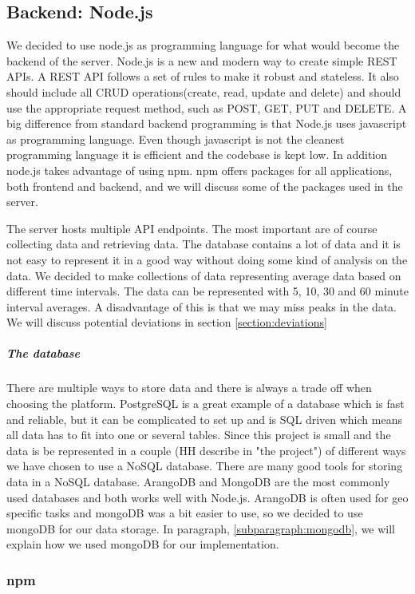 \documentclass[USenglish]{ifimaster}  %
\begin{document}
\subsection{Backend: Node.js}
We decided to use node.js as programming language for what would become the backend of the server. Node.js is a new and modern way to create simple REST APIs. A REST API follows a set of rules to make it robust and stateless. It also should include all CRUD operations(create, read, update and delete) and should use the appropriate request method, such as POST, GET, PUT and DELETE. A big difference from standard backend programming is that Node.js uses javascript as programming language. Even though javascript is not the cleanest programming language it is efficient and the codebase is kept low. In addition node.js takes advantage of using \acrfull{npm}. \acrshort{npm} offers packages for all applications, both frontend and backend, and we will discuss some of the packages used in the server.


The server hosts multiple API endpoints. The most important are of course collecting data and retrieving data. The database contains a lot of data and it is not easy to represent it in a good way without doing some kind of analysis on the data. We decided to make collections of data representing average data based on different time intervals. The data can be represented with 5, 10, 30 and 60 minute interval averages. A disadvantage of this is that we may miss peaks in the data. We will discuss potential deviations in section \vref{section:deviations}

\subparagraph{The database}
There are multiple ways to store data and there is always a trade off when choosing the platform. PostgreSQL is a great example of a database which is fast and reliable, but it can be complicated to set up and is SQL driven which means all data has to fit into one or several tables. Since this project is small and the data is be represented in a couple (HH describe in "the project") of different ways we have chosen to use a NoSQL database. There are many good tools for storing data in a NoSQL database. ArangoDB and MongoDB are the most commonly used databases and both works well with Node.js. ArangoDB is often used for geo specific tasks and mongoDB was a bit easier to use, so we decided to use mongoDB for our data storage. In paragraph, \vref{subparagraph:mongodb}, we will explain how we used mongoDB for our implementation.

\subsubsection{\acrshort{npm}}
\end{document}
